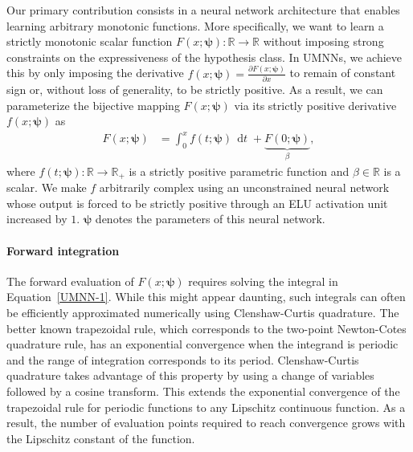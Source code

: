 \documentclass{article}
\newcommand{\mb}{\boldsymbol}
\newcommand{\mbb}{\mathbb}
\DeclareMathOperator{\dt}{\, \mathrm{d}\mathit{t}}
\begin{document}
Our primary contribution consists in a neural network architecture that enables learning arbitrary monotonic functions.
More specifically, we want to learn a strictly monotonic scalar function $F(x; \mb{\psi}): \mathbb{R}\rightarrow\mathbb{R}$ without imposing strong constraints on the expressiveness of the hypothesis class.
In UMNNs, we achieve this by only imposing the derivative $f(x; \mb{\psi}) = \tfrac{\partial F(x; \mb{\psi})}{\partial x}$ to remain of constant sign or, without loss of generality, to be strictly positive.
As a result, we can parameterize the bijective mapping $F(x; \mb{\psi})$ via its strictly positive derivative $f(x; \mb{\psi})$ as
\begin{align}
    F(x; \mb{\psi}) &= \int^x_0 f(t; \mb{\psi}) \dt + \underbrace{F(0; \mb{\psi})}_{\beta},\label{UMNN-1}%
\end{align}
where $f(t; \mb{\psi}): \mbb{R}\rightarrow\mbb{R}_+$ is a strictly positive parametric function and $\beta \in \mbb{R}$ is a scalar. We make $f$ arbitrarily complex using an unconstrained neural network whose output is forced to be strictly positive through an ELU activation unit increased by $1$. $\mb{\psi}$ denotes the parameters of this neural network.

\paragraph{Forward integration}
The forward evaluation of $F(x; \mb{\psi})$ requires solving the integral in Equation~\eqref{UMNN-1}. While this might appear daunting, such integrals can often be efficiently approximated numerically using Clenshaw-Curtis quadrature.
The better known trapezoidal rule, which corresponds to the two-point Newton-Cotes quadrature rule, has an exponential convergence when the integrand is periodic and the range of integration corresponds to its period. Clenshaw-Curtis quadrature takes advantage of this property by using a change of variables followed by a cosine transform. This extends the exponential convergence of the trapezoidal rule for periodic functions to any Lipschitz continuous function.
As a result, the number of evaluation points required to reach convergence grows with the Lipschitz constant of the function.
\end{document}
